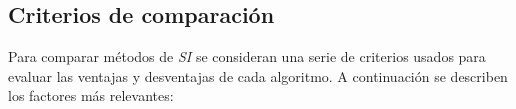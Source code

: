 %
%

\subsection{Criterios de comparación}

Para comparar métodos de \emph{SI} se consideran una serie de criterios usados para evaluar las ventajas y desventajas de cada algoritmo. A continuación se describen los factores más relevantes:

